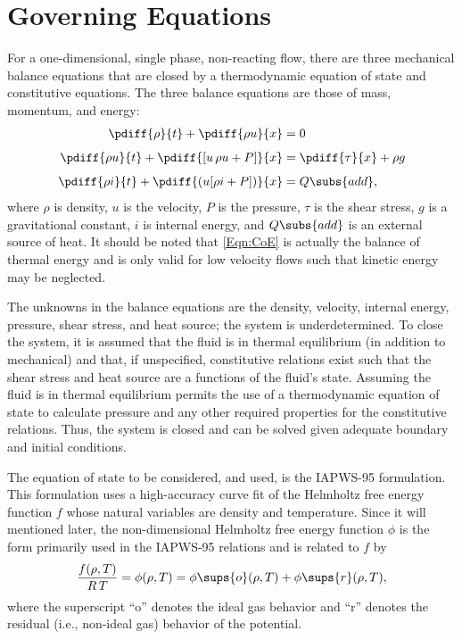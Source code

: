 \documentclass[12pt]{WisconsinThesis}
\newcommand{\Helm} {\ensuremath{\phi        (\rho,T)}\xspace}
\newcommand{\HelmO}{\ensuremath{\phi\sups{o}(\rho,T)}\xspace}
\newcommand{\HelmR}{\ensuremath{\phi\sups{r}(\rho,T)}\xspace}
\newcommand{\Skip}[1][0.45em]{\\[#1]}
\newcommand{\HFE}{Helmholtz free energy\xspace}
\begin{document}
\setcounter{chapter}{1}

\section{Governing Equations}
For a one-dimensional, single phase, non-reacting flow, there are three mechanical balance equations that are closed by a thermodynamic equation of state and constitutive equations.
The three balance equations are those of mass, momentum, and energy:
\begin{subequations}\label{Eqn:BalanceLaws}
    \begin{align}
        \pdiff{\rho   }{t} + \pdiff{\rho{u}}{x}          &= 0                           \label{Eqn:CoM} \Skip
        \pdiff{\rho{u}}{t} + \pdiff{[u\,\rho{u} + P]}{x} &= \pdiff{\tau}{x} + \rho{g}   \label{Eqn:CoP} \Skip
        \pdiff{\rho{i}}{t} + \pdiff{(u[\rho{i} + P])}{x} &= Q\subs{add},                \label{Eqn:CoE}
    \end{align}
\end{subequations}
where $\rho$ is density, $u$ is the velocity, $P$ is the pressure, $\tau$ is the shear stress, $g$ is a gravitational constant, $i$ is internal energy, and $Q\subs{add}$ is an external source of heat.
It should be noted that \cref{Eqn:CoE} is actually the balance of thermal energy and is only valid for low velocity flows such that kinetic energy may be neglected.

The unknowns in the balance equations are the density, velocity, internal energy, pressure, shear stress, and heat source; the system is underdetermined.
To close the system, it is assumed that the fluid is in thermal equilibrium (in addition to mechanical) and that, if unspecified, constitutive relations exist such that the shear stress and heat source are a functions of the fluid's state.
Assuming the fluid is in thermal equilibrium permits the use of a thermodynamic equation of state to calculate pressure and any other required properties for the constitutive relations.
Thus, the system is closed and can be solved given adequate boundary and initial conditions.

The equation of state to be considered, and used, is the IAPWS-95 formulation.  This formulation uses a high-accuracy curve fit of the \HFE function $f$ whose natural variables are density and temperature.  
Since it will mentioned later, the non-dimensional \HFE function $\phi$ is the form primarily used in the IAPWS-95 relations and is related to $f$ by
\begin{equation}
    \frac{f(\rho,T)}{R\,T} = \Helm = \HelmO + \HelmR, \notag
\end{equation}
where the superscript ``o'' denotes the ideal gas behavior and ``r'' denotes the residual (i.e., non-ideal gas) behavior of the potential.
\end{document}
